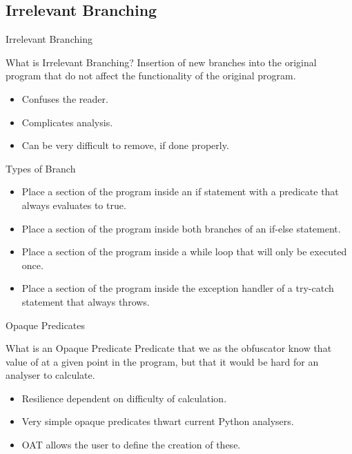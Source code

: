 \subsection{Irrelevant Branching}

\begin{frame}{Irrelevant Branching}
\begin{block}{What is Irrelevant Branching?}
Insertion of new branches into the original program that do not affect the functionality of the original program.
\end{block}
\begin{itemize}
\item Confuses the reader.
\item Complicates analysis.
\item Can be very difficult to remove, if done properly.
\end{itemize}
\end{frame}

\begin{frame}{Types of Branch}
\begin{itemize}
\item Place a section of the program inside an if statement with a predicate that always evaluates to true.
\item Place a section of the program inside both branches of an if-else statement.
\item Place a section of the program inside a while loop that will only be executed once.
\item Place a section of the program inside the exception handler of a try-catch statement that always throws.
\end{itemize}
\end{frame}

\begin{frame}{Opaque Predicates}
\begin{block}{What is an Opaque Predicate}
Predicate that we as the obfuscator know that value of at a given point in the program, but that it would be hard for an analyser to calculate.
\end{block}
\begin{itemize}
\item Resilience dependent on difficulty of calculation.
\item Very simple opaque predicates thwart current Python analysers.
\item OAT allows the user to define the creation of these.
\end{itemize}
\end{frame}

